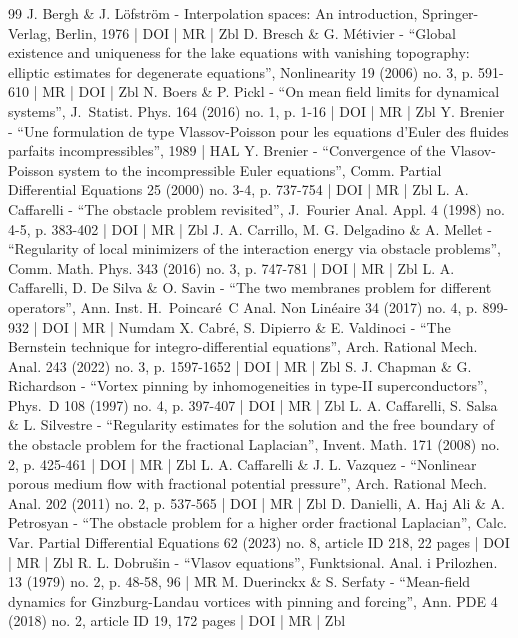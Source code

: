 \documentclass[10pt]{amsart}
\theoremstyle{plain}
\theoremstyle{definition}
\begin{document}
\begin{thebibliography}{99}
J. Bergh \& J. Löfström - Interpolation spaces: An introduction, Springer-Verlag, Berlin, 1976 | DOI | MR | Zbl
D. Bresch \& G. Métivier - “Global existence and uniqueness for the lake equations with vanishing topography: elliptic estimates for degenerate equations”, Nonlinearity 19 (2006) no. 3, p. 591-610 | MR | DOI | Zbl
N. Boers \& P. Pickl - “On mean field limits for dynamical systems”, J. Statist. Phys. 164 (2016) no. 1, p. 1-16 | DOI | MR | Zbl
Y. Brenier - “Une formulation de type Vlassov-Poisson pour les equations d’Euler des fluides parfaits incompressibles”, 1989 | HAL
Y. Brenier - “Convergence of the Vlasov-Poisson system to the incompressible Euler equations”, Comm. Partial Differential Equations 25 (2000) no. 3-4, p. 737-754 | DOI | MR | Zbl
L. A. Caffarelli - “The obstacle problem revisited”, J. Fourier Anal. Appl. 4 (1998) no. 4-5, p. 383-402 | DOI | MR | Zbl
J. A. Carrillo, M. G. Delgadino \& A. Mellet - “Regularity of local minimizers of the interaction energy via obstacle problems”, Comm. Math. Phys. 343 (2016) no. 3, p. 747-781 | DOI | MR | Zbl
L. A. Caffarelli, D. De Silva \& O. Savin - “The two membranes problem for different operators”, Ann. Inst. H. Poincaré C Anal. Non Linéaire 34 (2017) no. 4, p. 899-932 | DOI | MR | Numdam
X. Cabré, S. Dipierro \& E. Valdinoci - “The Bernstein technique for integro-differential equations”, Arch. Rational Mech. Anal. 243 (2022) no. 3, p. 1597-1652 | DOI | MR | Zbl
S. J. Chapman \& G. Richardson - “Vortex pinning by inhomogeneities in type-II superconductors”, Phys. D 108 (1997) no. 4, p. 397-407 | DOI | MR | Zbl
L. A. Caffarelli, S. Salsa \& L. Silvestre - “Regularity estimates for the solution and the free boundary of the obstacle problem for the fractional Laplacian”, Invent. Math. 171 (2008) no. 2, p. 425-461 | DOI | MR | Zbl
L. A. Caffarelli \& J. L. Vazquez - “Nonlinear porous medium flow with fractional potential pressure”, Arch. Rational Mech. Anal. 202 (2011) no. 2, p. 537-565 | DOI | MR | Zbl
D. Danielli, A. Haj Ali \& A. Petrosyan - “The obstacle problem for a higher order fractional Laplacian”, Calc. Var. Partial Differential Equations 62 (2023) no. 8, article ID 218, 22 pages | DOI | MR | Zbl
R. L. Dobrušin - “Vlasov equations”, Funktsional. Anal. i Prilozhen. 13 (1979) no. 2, p. 48-58, 96 | MR
M. Duerinckx \& S. Serfaty - “Mean-field dynamics for Ginzburg-Landau vortices with pinning and forcing”, Ann. PDE 4 (2018) no. 2, article ID 19, 172 pages | DOI | MR | Zbl

\end{thebibliography}
\end{document}
